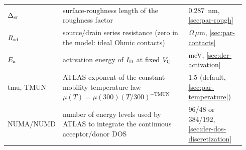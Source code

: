 {\begin{longtable}{@{}p{0.17\linewidth}p{0.53\linewidth}p{0.24\linewidth}@{}}
$\Delta_{\mathrm{sr}}$ & surface-roughness length of the roughness factor & \SI{0.287}{nm}, \cref{sec:par-rough} \\
$R_{\mathrm{sd}}$ & source/drain series resistance (zero in the model: ideal Ohmic contacts) & $\Omega\,\mu$m, \cref{sec:par-contacts} \\
$E_{\mathrm{a}}$ & activation energy of $I_{\mathrm{D}}$ at fixed $V_{\mathrm{G}}$ & meV, \cref{sec:der-activation} \\
tmu, TMUN & ATLAS exponent of the constant-mobility temperature law $\mu(T) = \mu(300)(T/300)^{-\mathrm{TMUN}}$ & 1.5 (default, \cref{sec:par-temperature}) \\
NUMA/NUMD & number of energy levels used by ATLAS to integrate the continuous acceptor/donor DOS & 96/48 or 384/192, \cref{sec:der-dos-discretization} \\
\end{longtable}}

